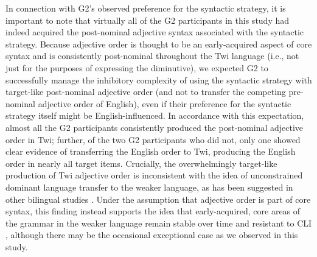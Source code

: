 \documentclass[output=paper,colorlinks,citecolor=brown]{langscibook}
\begin{document}
In connection with G2's observed preference for the syntactic strategy, it is important to note that virtually all of the G2 participants in this study had indeed acquired the post-nominal adjective syntax associated with the syntactic strategy. Because adjective order is thought to be an early-acquired aspect of core syntax \citep[mastered as early as age 2; see][]{Brown1973, ParadisNicoladisGenesee2000, Nicoladis2002} and is consistently post-nominal throughout the Twi language (i.e., not just for the purposes of expressing the diminutive), we expected G2 to successfully manage the inhibitory complexity of using the syntactic strategy with target-like post-nominal adjective order (and not to transfer the competing pre-nominal adjective order of English), even if their preference for the syntactic strategy itself might be English-influenced. In accordance with this expectation, almost all the G2 participants consistently produced the post-nominal adjective order in Twi; further, of the two G2 participants who did not, only one showed clear evidence of transferring the English order to Twi, producing the English order in nearly all target items. Crucially, the overwhelmingly target-like production of Twi adjective order is inconsistent with the idea of unconstrained dominant language transfer to the weaker language, as has been suggested in other bilingual studies \citep[e.g.,][]{YipMatthews2000}. Under the assumption that adjective order is part of core syntax, this finding instead supports the idea that early-acquired, core areas of the grammar in the weaker language remain stable over time and resistant to CLI \citep{SoraceFiliaci2006, Sorace2011}, although there may be the occasional exceptional case as we observed in this study.\largerpage[-1]
\end{document}
